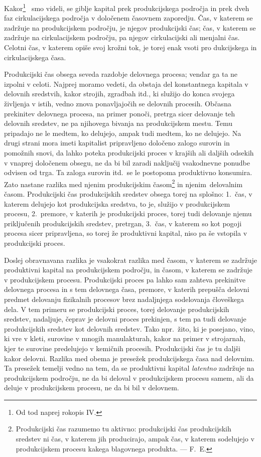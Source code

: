 \documentclass[kapital_02.tex]{subfiles}
\begin{document}
Kakor\footnote{Od tod naprej rokopis IV.}%
\KPEstran\ smo videli, se giblje kapital prek produkcijskega področja in prek dveh faz cirkulacijskega področja v določenem časovnem zaporedju. Čas, v katerem se zadržuje na produkcijskem področju, je njegov produkcijski čas; čas, v katerem se zadržuje na cirkulacijskem področju, pa njegov cirkulacijski ali menjalni čas. Celotni čas, v katerem opiše svoj krožni tok, je torej enak vsoti pro dukcijskega in cirkulacijskega časa.

Produkcijski čas obsega seveda razdobje delovnega procesa; vendar ga ta ne izpolni v celoti.
Najprej moramo vedeti, da obstaja del konstantnega kapitala v delovnih sredstvih, kakor strojih, zgradbah itd., ki služijo do konca svojega življenja v istih, vedno znova ponavljajočih se delovnih procesih. 
Občasna prekinitev delovnega procesa, na primer ponoči, pretrga sicer delovanje teh delovnih sredstev, ne pa njihovega bivanja na produkcijskem mestu.
Temu pripadajo ne le medtem, ko delujejo, ampak tudi medtem, ko ne delujejo.
Na drugi strani mora imeti kapitalist pripravljeno določeno zalogo surovin in pomožnih snovi, da lahko poteka produkcijski proces v krajših ali daljših odsekih v vnaprej določenem obsegu, ne da bi bil zaradi naključij vsakodnevne ponudbe odvisen od trga. 
Ta zaloga surovin itd.\ se le postopoma produktivno konsumira.
Zato nastane razlika med njenim produkcijskim časom\footnote{Produkcijski čas razumemo tu aktivno: produkcijski čas produkcijskih sredstev ni čas, v katerem jih producirajo, ampak čas, v katerem sodelujejo v produkcijskem procesu kakega blagovnega produkta. — F.\ E.} 
in njenim\KPEstran\ delovalnim časom.
Produkcijski čas produkcijskih sredstev obsega torej na splošno: 1.\ čas, v katerem delujejo kot produkcijska sredstva, to je, služijo v produkcijskem procesu, 2.\ premore, v katerih je produkcijski proces, torej tudi delovanje njemu priključenih produkcijskih sredstev, pretrgan, 3.\ čas, v katerem so kot pogoji procesa sicer pripravljena, so torej že produktivni kapital, niso pa še vstopila v produkcijski proces.

Doslej obravnavana razlika je vsakokrat razlika med časom, v katerem se zadržuje produktivni kapital na produkcijskem področju, in časom, v katerem se zadržuje v produkcijskem procesu.
Produkcijski proces pa lahko sam zahteva prekinitve delovnega procesa in s tem delovnega časa, premore, v katerih prepušča delovni predmet delovanju fizikalnih procesov brez nadaljnjega sodelovanja človeškega dela.
V tem primeru se produkcijski proces, torej delovanje produkcijskih sredstev, nadaljuje, čeprav je delovni proces prekinjen, s tem pa tudi delovanje produkcijskih sredstev kot delovnih sredstev.
Tako npr.\ žito, ki je posejano, vino, ki vre v kleti, surovine v mnogih manulakturah, kakor na primer v strojarnah, kjer te surovine predelujejo v kemičnih procesih.
Produkcijski čas je tu daljši kakor delovni.
Razlika med obema je presežek produkcijskega časa nad delovnim.
Ta presežek temelji vedno na tem, da se produktivni kapital \emph{latentno} zadržuje na produkcijskem področju, ne da bi deloval v produkcijskem procesu samem, ali da deluje v produkcijskem procesu, ne da bi bil v delovnem.
\end{document}
